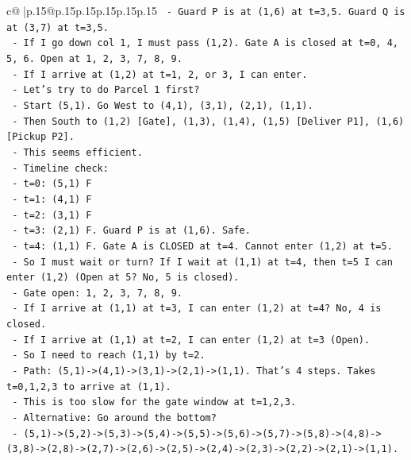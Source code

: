 \documentclass{article}
\begin{document}
{\begin{supertabular}{c@{$\;$}|p{.15\linewidth}@{}p{.15\linewidth}p{.15\linewidth}p{.15\linewidth}p{.15\linewidth}p{.15\linewidth}}
{{{\texttt{      {-} Guard P is at (1,6) at t=3,5. Guard Q is at (3,7) at t=3,5.} \\
\texttt{      {-} If I go down col 1, I must pass (1,2). Gate A is closed at t=0, 4, 5, 6. Open at 1, 2, 3, 7, 8, 9.} \\
\texttt{      {-} If I arrive at (1,2) at t=1, 2, or 3, I can enter.} \\
\texttt{      {-} Let's try to do Parcel 1 first?} \\
\texttt{        {-} Start (5,1). Go West to (4,1), (3,1), (2,1), (1,1).} \\
\texttt{        {-} Then South to (1,2) {[}Gate{]}, (1,3), (1,4), (1,5) {[}Deliver P1{]}, (1,6) {[}Pickup P2{]}.} \\
\texttt{        {-} This seems efficient.} \\
\texttt{        {-} Timeline check:} \\
\texttt{          {-} t=0: (5,1) F} \\
\texttt{          {-} t=1: (4,1) F} \\
\texttt{          {-} t=2: (3,1) F} \\
\texttt{          {-} t=3: (2,1) F. Guard P is at (1,6). Safe.} \\
\texttt{          {-} t=4: (1,1) F. Gate A is CLOSED at t=4. Cannot enter (1,2) at t=5.} \\
\texttt{          {-} So I must wait or turn? If I wait at (1,1) at t=4, then t=5 I can enter (1,2) (Open at 5? No, 5 is closed).} \\
\texttt{          {-} Gate open: 1, 2, 3, 7, 8, 9.} \\
\texttt{          {-} If I arrive at (1,1) at t=3, I can enter (1,2) at t=4? No, 4 is closed.} \\
\texttt{          {-} If I arrive at (1,1) at t=2, I can enter (1,2) at t=3 (Open).} \\
\texttt{          {-} So I need to reach (1,1) by t=2.} \\
\texttt{          {-} Path: (5,1){-}>(4,1){-}>(3,1){-}>(2,1){-}>(1,1). That's 4 steps. Takes t=0,1,2,3 to arrive at (1,1).} \\
\texttt{          {-} This is too slow for the gate window at t=1,2,3.} \\
\texttt{          {-} Alternative: Go around the bottom?} \\
\texttt{            {-} (5,1){-}>(5,2){-}>(5,3){-}>(5,4){-}>(5,5){-}>(5,6){-}>(5,7){-}>(5,8){-}>(4,8){-}>(3,8){-}>(2,8){-}>(2,7){-}>(2,6){-}>(2,5){-}>(2,4){-}>(2,3){-}>(2,2){-}>(2,1){-}>(1,1).} \\
}}}
\end{supertabular}}
\end{document}
